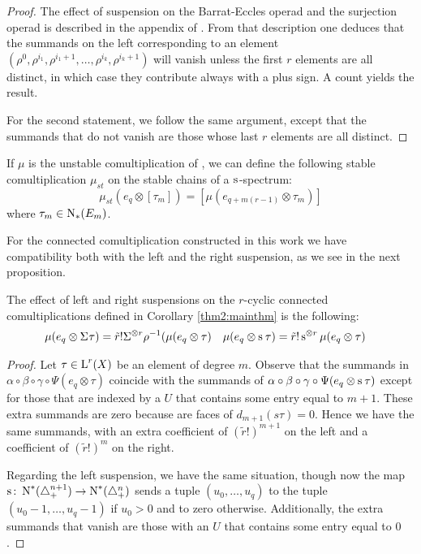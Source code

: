 \begin{proof}
    The effect of suspension on the Barrat-Eccles operad and the surjection operad is described in the appendix of \cite{berger2004combinatorial}. From that description one deduces that the summands on the left corresponding to an element $(\rho^0,\rho^{i_1},\rho^{i_1+1},\ldots,\rho^{i_k},\rho^{i_k+1})$ will vanish unless the first $r$ elements are all distinct, in which case they contribute always with a plus sign. A count yields the result.

    For the second statement, we follow the same argument, except that the summands that do not vanish are those whose last $r$ elements are all distinct.
\end{proof}

\begin{corollary}
    If $\mu$ is the unstable comultiplication of \cite{medina2021may_st}, we can define the following stable comultiplication $\mu_{st}$ on the stable chains of a $\operatorname{s}^{}$-spectrum:
    \[
        \mu_{st}(e_q\otimes [\tau_m]) = [\mu(e_{q+m(r-1)}\otimes \tau_m)]
    \]
    where $\tau_m\in \operatorname{N}_*(E_m)$.
\end{corollary}

For the connected comultiplication constructed in this work we have compatibility both with the left and the right suspension, as we see in the next proposition.

\begin{proposition}\label{prop:suspensionconnected}
    The effect of left and right suspensions on the $r$-cyclic connected comultiplications defined in Corollary \ref{thm2:mainthm} is the following:
    \begin{align*}
       \mu(e_q\otimes \Sigma^{}\tau) &= \tilde{r}!\Sigma^{\otimes r}\rho^{-1}(\mu(e_q\otimes \tau) &
       \mu(e_q\otimes \operatorname{s}^{}\tau) &= \tilde{r}!\operatorname{s}^{\otimes r}\mu(e_q\otimes \tau)
    \end{align*}
\end{proposition}

\begin{proof}
    Let $\tau\in \operatorname{L}^r(X)$ be an element of degree $m$. Observe that the summands in $\alpha\circ\beta\circ\gamma\circ \Psi(e_q\otimes \tau)$ coincide with the summands of $\alpha\circ\beta\circ\gamma\circ \Psi(e_q\otimes \operatorname{s}^{}\tau)$ except for those that are indexed by a $U$ that contains some entry equal to $m+1$. These extra summands are zero because are faces of $d_{m+1}(s{} \tau) = 0$. Hence we have the same summands, with an extra coefficient of $(\tilde{r}!)^{m+1}$ on the left and a coefficient of $(\tilde{r}!)^m$ on the right.

    Regarding the left suspension, we have the same situation, though now the map $\operatorname{s}^{}\colon \operatorname{N}^*(\triangle_{+}^{n+1})\to \operatorname{N}^*(\triangle_{+}^{n})$ sends a tuple $(u_0,\ldots,u_q)$ to the tuple $(u_0-1,\ldots,u_q-1)$ if $u_0>0$ and to zero otherwise. Additionally, the extra summands that vanish are those with an $U$ that contains some entry equal to $0$.
\end{proof}

